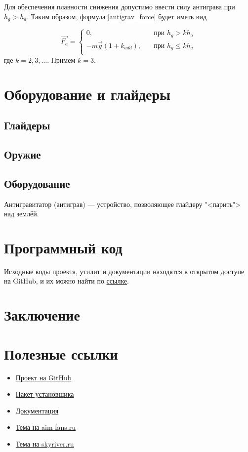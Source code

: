 \documentclass[a4paper,12pt]{report}
\begin{document}
Для обеспечения плавности снижения допустимо ввести силу антиграва при $h_{g} > h_a$. Таким образом, формула \eqref{antigrav_force} будет иметь вид

\begin{equation}
\vec{F_a} =
\begin{cases}
0, & \quad \text{при } h_{g} > k h_a \\
-m\vec{g}(1+ k_{add}), & \quad \text{при } h_{g} \le k h_a \\
\end{cases}
\end{equation}
где $k=2,3,\dots$. Примем $k=3$.

\chapter{Оборудование и глайдеры}
\section{Глайдеры}
\section{Оружие}
\section{Оборудование}

Антигравитатор (антиграв) --- устройство, позволяющее глайдеру "<парить"> над землёй.

\chapter{Программный код}

Исходные коды проекта, утилит и документации находятся в открытом доступе на GitHub, и их можно найти по \href{https://github.com/aimrebirth}{ссылке}.

\chapter*{Заключение}

\chapter*{Полезные ссылки}

\begin{itemize}
\item \href{https://github.com/aimrebirth}{Проект на GitHub}
\item \href{https://www.dropbox.com/s/0zhbgb1ftspcv9w/polygon4.zip?dl=1}{Пакет установщика}
\item \href{https://www.dropbox.com/s/ipnakg5civ0xp0g/Polygon4_ru.pdf?dl=1}{Документация}
\item \href{http://aim-fans.ru/index.php?showtopic=147}{Тема на aim-fans.ru}
\item \href{http://forum.skyriver.ru/viewtopic.php?f=26&t=4801}{Тема на skyriver.ru}
\end{itemize}
\end{document}

